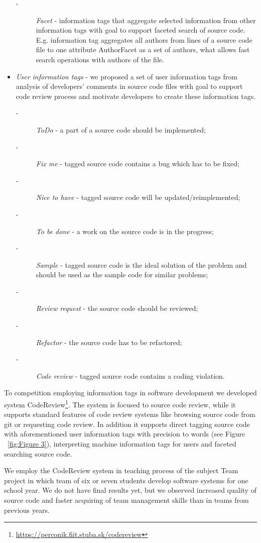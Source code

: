\documentclass[18px,a4, conference]{IEEEtran}
\begin{document}
\begin{itemize}
  
\begin{description}
 \item[-]{ \textit{Facet} - information tags that aggregate selected information from other information tags with goal to support faceted search of source code. E.g. information tag aggregates all authors from lines of a source code ﬁle to one attribute AuthorFacet as a set of authors, what allows fast search operations with authors of the ﬁle.}
\end{description} 
\item {\textit{User information tags} - we proposed a set of user information tags from analysis of developers’ comments in source code ﬁles with goal to support code review process and motivate developers to create these information tags.}
\begin{description}
  \item[-]{ \textit{ToDo} - a part of a source code should be implemented;}
  \item[-]{\textit{Fix me} - tagged source code contains a bug which has to be ﬁxed;}
  \item[-]{\textit{Nice to have} - tagged source code will be updated/reimplemented;}
  \item[-]{\textit{To be done} - a work on the source code is in the progress;}
  \item[-]{\textit{Sample} - tagged source code is the ideal solution of the problem and should be used as the sample code for similar problems;}
  \item[-]{\textit{Review request} - the source code should be reviewed;}
  \item[-]{\textit{Refactor} - the source code has to be refactored;}
  \item[-]{\textit{Code review} - tagged source code contains a coding violation.}
\end{description}
\end{itemize}
 To competition employing information tags in software development we developed system CodeReview\footnote{\url{https://perconik.ﬁit.stuba.sk/codereview}}. The system is focused to source code review, while it supports standard features of code review systems like browsing source code from git or requesting code review. In addition it supports direct tagging source code with aforementioned user information tags with precision to words (see Figure ~\ref{fig:Figure 3}), interpreting machine information tags for users and faceted searching source code. 

We employ the CodeReview system in teaching process of the subject Team project in which team of six or seven students develop software systems for one school year. We do not have ﬁnal results yet, but we observed increased quality of source code and faster acquiring of team management skills than in teams from previous years.
\end{document}
